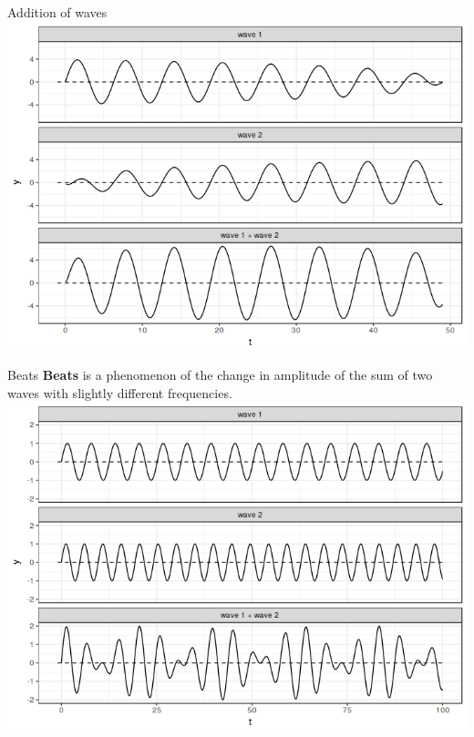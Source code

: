 \begin{frame}{Addition of waves}
\includegraphics[width=0.9\linewidth]{14-wave-addition.png}
\end{frame}

\begin{frame}{Beats}
\textbf{Beats} is a phenomenon of the change in amplitude of the sum of two waves with slightly different frequencies.
\includegraphics[width=0.9\linewidth]{15-beats.png}
\end{frame}

